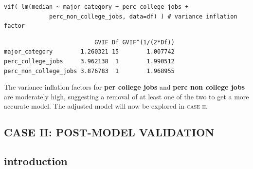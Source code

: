 \documentclass[10pt, twoside, openleft]{article}
\begin{document}
\begin{verbatim}
vif( lm(median ~ major_category + perc_college_jobs +
	         perc_non_college_jobs, data=df) ) # variance inflation factor
\end{verbatim}

\begin{verbatim}
                          GVIF Df GVIF^(1/(2*Df))
major_category        1.260321 15        1.007742
perc_college_jobs     3.962138  1        1.990512
perc_non_college_jobs 3.876783  1        1.968955
\end{verbatim}

\noindent
The variance inflation factors for \textbf{per college jobs} and \textbf{perc non college jobs}
are moderately high, suggesting a removal of at least one of the two to get a more accurate model.
The adjusted model will now be explored in \textsc{case ii}.
\bigskip

\begin{center}
\section{CASE II: POST-MODEL VALIDATION}
\vspace{-5ex}
\end{center}

\begin{center}
\subsection{introduction}
\vspace{-3ex}
\end{center}
\end{document}
